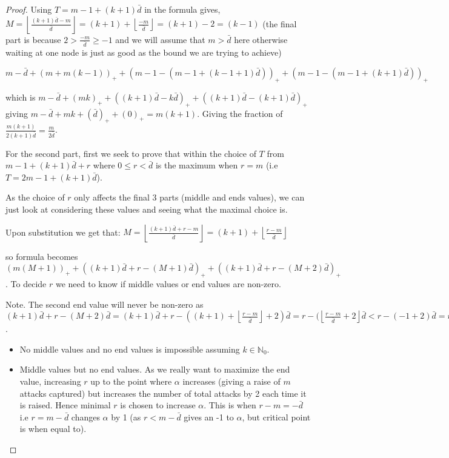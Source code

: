 \documentclass[a4paper,10pt]{article}
\newcommand{\floor}[1]{\left \lfloor #1 \right \rfloor}
\newcommand{\pospart}[1]{\left( #1 \right)_{+}}
\theoremstyle{definition}
\theoremstyle{definition}
\theoremstyle{remark}
\theoremstyle{definition}
\begin{document}
\begin{proof}
Using $T=m-1+(k+1)\bar{d}$ in the formula gives,
$M=\floor{\frac{(k+1) \bar{d}-m}{\bar{d}}}=(k+1)+\floor{\frac{-m}{\bar{d}}}=(k+1)-2=(k-1)$ (the final part is because $2>\frac{-m}{\bar{d}} \geq -1$ and we will assume that $m > \bar{d}$ here otherwise waiting at one node is just as good as the bound we are trying to achieve)

$m-\bar{d}+\pospart{m + m(k-1)} + \pospart{m-1-(m-1+(k-1+1)\bar{d})}+\pospart{m-1-(m-1+(k+1)\bar{d})}$

which is $m-\bar{d}+\pospart{mk} + \pospart{(k+1)\bar{d}-k\bar{d}}+\pospart{(k+1)\bar{d}-(k+1)\bar{d}}$
giving $m-\bar{d}+mk+ \pospart{\bar{d}}+\pospart{0}=m(k+1)$.
Giving the fraction of $\frac{m(k+1)}{2(k+1)\bar{d}}=\frac{m}{2 \bar{d}}$.


For the second part, first we seek to prove that within the choice of $T$ from $m-1+(k+1)\bar{d}+r$ where $0 \leq r < \bar{d}$ is the maximum when $r=m$ (i.e $T=2m-1+(k+1)\bar{d}$).

As the choice of $r$ only affects the final 3 parts (middle and ends values), we can just look at considering these values and seeing what the maximal choice is.

Upon substitution we get that:
$M=\floor{\frac{(k+1)\bar{d}+r-m}{\bar{d}}}=(k+1)+\floor{\frac{r-m}{\bar{d}}}$

so formula becomes
$\pospart{m(M+1)}+\pospart{(k+1)\bar{d}+r-(M+1)\bar{d}}+
\pospart{(k+1)\bar{d}+r-(M+2)\bar{d}}$. To decide $r$ we need to know if middle values or end values are non-zero.

Note. The second end value will never be non-zero as $(k+1)\bar{d}+r-(M+2)\bar{d}=(k+1)\bar{d}+r-((k+1)+\floor{\frac{r-m}{\bar{d}}}+2)\bar{d}=r-(\floor{\frac{r-m}{\bar{d}}+2}\bar{d} < r-(-1+2)\bar{d}=r-\bar{d}<0$.

\begin{itemize}
\item No middle values and no end values is impossible assuming $k \in \mathbb{N}_{0}$.

\item Middle values but no end values. As we really want to maximize the end value, increasing $r$ up to the point where $\alpha$ increases (giving a raise of $m$ attacks captured) but increases the number of total attacks by 2 each time it is raised. Hence minimal $r$ is chosen to increase $\alpha$. This is when $r-m=-\bar{d}$ i.e $r=m-\bar{d}$ changes $\alpha$ by 1 (as $r<m-\bar{d}$ gives an -1 to $\alpha$, but critical point is when equal to).


\end{itemize}
\end{proof}
\end{document}
